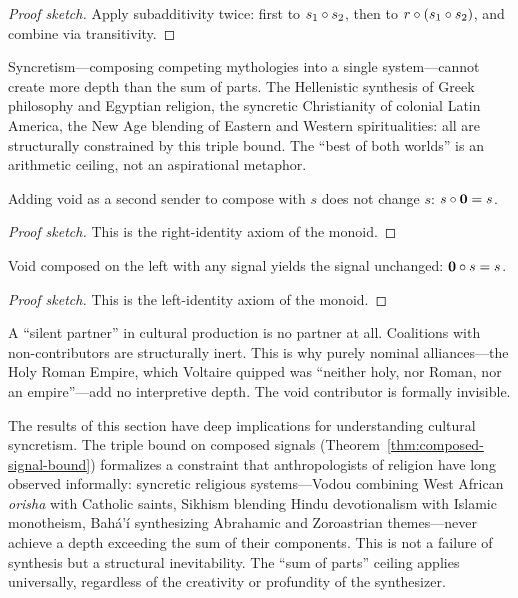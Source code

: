 \begin{proof}[Proof sketch]
Apply subadditivity twice: first to $s_1 \circ s_2$, then to
$r \circ (s_1 \circ s_2)$, and combine via transitivity.
\end{proof}

Syncretism---composing competing mythologies into a single system---cannot
create more depth than the sum of parts.  The Hellenistic synthesis of Greek
philosophy and Egyptian religion, the syncretic Christianity of colonial Latin
America, the New Age blending of Eastern and Western spiritualities: all are
structurally constrained by this triple bound.  The ``best of both worlds'' is
an arithmetic ceiling, not an aspirational metaphor.

\begin{theorem}
\label{thm:void-comp-right}
Adding void as a second sender to compose with $s$ does not change $s$:
$s \circ \mathbf{0} = s$.
\end{theorem}

\begin{proof}[Proof sketch]
This is the right-identity axiom of the monoid.
\end{proof}

\begin{theorem}
\label{thm:void-comp-left}
Void composed on the left with any signal yields the signal unchanged:
$\mathbf{0} \circ s = s$.
\end{theorem}

\begin{proof}[Proof sketch]
This is the left-identity axiom of the monoid.
\end{proof}

A ``silent partner'' in cultural production is no partner at all.  Coalitions
with non-contributors are structurally inert.  This is why purely nominal
alliances---the Holy Roman Empire, which Voltaire quipped was ``neither holy,
nor Roman, nor an empire''---add no interpretive depth.  The void contributor
is formally invisible.

The results of this section have deep implications for understanding
cultural syncretism.  The triple bound on composed signals
(Theorem~\ref{thm:composed-signal-bound}) formalizes a constraint that
anthropologists of religion have long observed informally: syncretic
religious systems---Vodou combining West African \emph{orisha} with
Catholic saints, Sikhism blending Hindu devotionalism with Islamic
monotheism, Bahá'í synthesizing Abrahamic and Zoroastrian themes---never
achieve a depth exceeding the sum of their components.  This is not a
failure of synthesis but a structural inevitability.  The ``sum of parts''
ceiling applies universally, regardless of the creativity or profundity
of the synthesizer.

